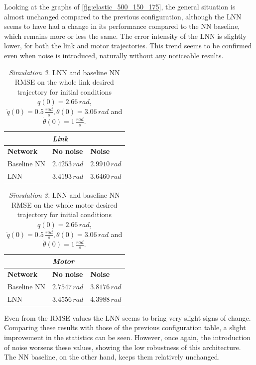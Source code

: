\documentclass[a4paper]{article}
\begin{document}
Looking at the graphs of \ref{fig:elastic_500_150_175}, the general situation is almost unchanged compared to the previous configuration, although the LNN seems to have had a change in its performance compared to the NN baseline, which remains more or less the same. The error intensity of the LNN is slightly lower, for both the link and motor trajectories. This trend seems to be confirmed even when noise is introduced, naturally without any noticeable results.\\

\begin{table}
    \centering
    \caption{\textit{Simulation 3.} LNN and baseline NN RMSE on the whole link desired trajectory for initial conditions $q(0)=2.66\, rad$, $\dot{q}(0)=0.5\, \frac{rad}{s}, \theta(0)=3.06\, rad$ and $\dot{\theta}(0)=1\, \frac{rad}{s}.$}
    \begin{tabular}{P{2.5cm}P{2.5cm}P{2.5cm}} 
    \hline\hline
    &\textit{Link}&\\
    \hline
    \textbf{Network} & \textbf{No noise} & \textbf{Noise} \\ 
    \hline
     Baseline NN & $2.4253\, rad$ & $2.9910\, rad$\\
    \hline
     LNN & $3.4193\, rad$& $3.6460\, rad$\\
    \hline\hline
    \end{tabular}
    \label{tab:elastic_link_rmse_500_1}    
\end{table}

\begin{table}
    \centering
    \caption{\textit{Simulation 3.} LNN and baseline NN RMSE on the whole motor desired trajectory for initial conditions $q(0)=2.66\, rad$, $\dot{q}(0)=0.5\, \frac{rad}{s}, \theta(0)=3.06\, rad$ and $\dot{\theta}(0)=1\, \frac{rad}{s}.$}
    \begin{tabular}{P{2.5cm}P{2.5cm}P{2.5cm}} 
    \hline\hline
    &\textit{Motor}&\\
    \hline
    \textbf{Network} & \textbf{No noise} & \textbf{Noise} \\ 
    \hline
     Baseline NN & $2.7547\, rad$ & $3.8176\, rad$\\
    \hline
     LNN & $3.4556\, rad$& $4.3988\, rad$\\
    \hline\hline
    \end{tabular}
    \label{tab:elastic_motor_rmse_500_1}    
\end{table}

Even from the RMSE values the LNN seems to bring very slight signs of change. Comparing these results with those of the previous configuration table, a slight improvement in the statistics can be seen. However, once again, the introduction of noise worsens these values, showing the low robustness of this architecture. The NN baseline, on the other hand, keeps them relatively unchanged.\\
\end{document}
